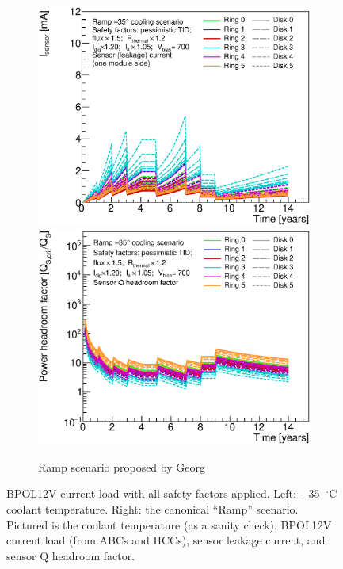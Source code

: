 \begin{figure}[ht!]
\begin{subfigure}[t]{0.50\textwidth}
\begin{center}
\includegraphics[width=0.74\linewidth]{figures/studies/Endcap_SensorCurrent_Ramp_m35.eps}
\includegraphics[width=0.74\linewidth]{figures/studies/Endcap_SensorQHeadroom_Ramp_m35.eps}
\end{center}
\caption{Ramp scenario proposed by Georg}
\end{subfigure}
\caption{BPOL12V current load with all safety factors applied. Left: $-35$~$^{\circ}$C coolant
temperature. Right: the canonical ``Ramp'' scenario. Pictured is the coolant temperature
(as a sanity check), BPOL12V current load (from ABCs and HCCs), sensor leakage current, and sensor Q
headroom factor.}
\label{summary_currentramp}
\end{figure}

